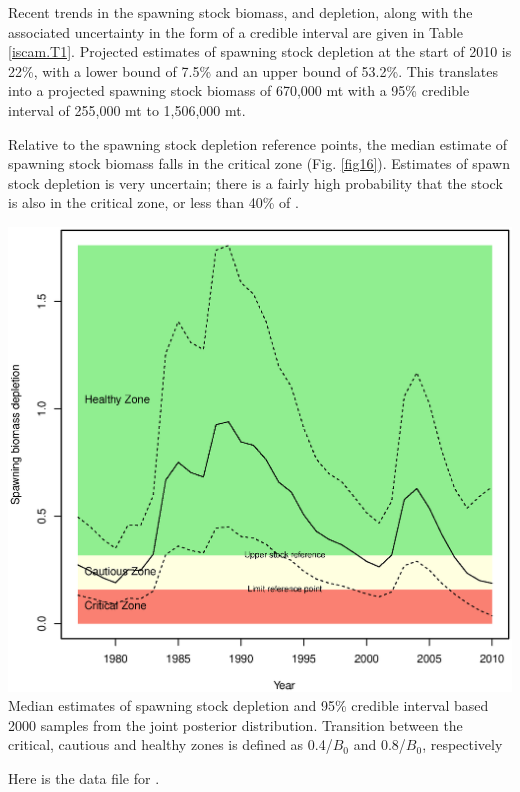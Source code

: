 \begin{multicols}{2}
Recent trends in the spawning stock biomass, and depletion, along with the associated uncertainty in the form of a credible interval are given in Table \ref{iscam.T1}.  Projected estimates of spawning stock depletion at the start of 2010 is 22\%, with a lower bound of 7.5\% and an upper bound of 53.2\%.  This translates into a projected spawning stock biomass of 670,000 mt with a 95\% credible interval of 255,000 mt to 1,506,000 mt.

\begin{tiny}

\end{tiny}

Relative to the spawning stock depletion reference points, the median estimate of spawning stock biomass falls in the critical zone (Fig. \ref{fig16}).  Estimates of spawn stock depletion is very uncertain; there is a fairly high probability that the stock is also in the critical zone, or less than 40\% of \bmsy.

\begin{figurehere}
	\centering
	\includegraphics[width=\columnwidth]{iscamFigs/phakefig12.eps}\\
	\caption{Median estimates of spawning stock depletion and 95\% credible interval based 2000 samples from the joint posterior distribution. Transition between the critical, cautious and healthy zones is defined as 0.4\bmsy/$B_0$ and 0.8\bmsy/$B_0$, respectively }\label{fig16}
\end{figurehere}

\begin{scriptsize}

\end{scriptsize}

\end{multicols}




Here is the data file for \iscam.
\tiny
\begin{alltt}
  \label{HakeDataFile}
\end{alltt}
\normalsize

